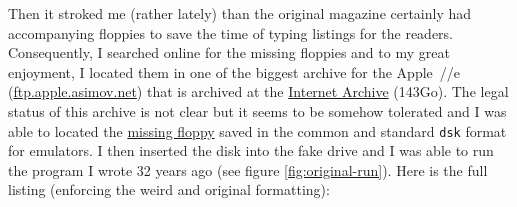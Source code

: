 Then it stroked me (rather lately) than the original magazine certainly had
accompanying floppies to save the time of typing listings for the
readers. Consequently, I searched online for the missing floppies and to my
great enjoyment, I located them in one of the biggest archive for the Apple~//e
(\href{https://mirrors.apple2.org.za}{ftp.apple.asimov.net}) that is archived at
the \href{https://archive.org/details/ftp.apple.asimov.net}{Internet Archive}
(143Go). The legal status of this archive is not clear but it seems to be
somehow tolerated and I was able to located
the \href{https://mirrors.apple2.org.za/ftp.apple.asimov.net/images/non-english/french/tremplinmicro/}{missing
floppy} saved in the common and standard {\tt dsk} format for emulators. I
then inserted the disk into the fake drive and I was able to run the program I
wrote 32 years ago (see figure \ref{fig:original-run}). Here is the full
listing (enforcing the weird and original formatting):\\

